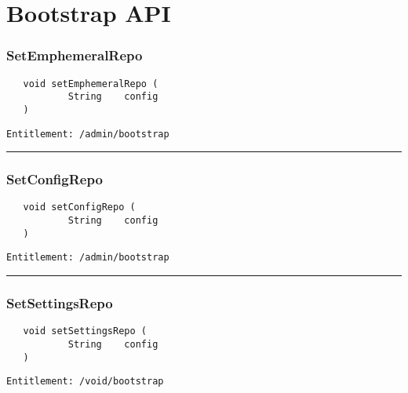 \chapter{Bootstrap API}

\subsection{SetEmphemeralRepo}
\label{Api:SetEmphemeralRepo}
\begin{Verbatim}
   void setEmphemeralRepo (
           String    config
   )
\end{Verbatim}
\begin{Verbatim}[formatcom=\color{Maroon}]
  Entitlement: /admin/bootstrap
\end{Verbatim}



\rule{12cm}{2pt}
\subsection{SetConfigRepo}
\label{Api:SetConfigRepo}
\begin{Verbatim}
   void setConfigRepo (
           String    config
   )
\end{Verbatim}
\begin{Verbatim}[formatcom=\color{Maroon}]
  Entitlement: /admin/bootstrap
\end{Verbatim}



\rule{12cm}{2pt}
\subsection{SetSettingsRepo}
\label{Api:SetSettingsRepo}
\begin{Verbatim}
   void setSettingsRepo (
           String    config
   )
\end{Verbatim}
\begin{Verbatim}[formatcom=\color{Maroon}]
  Entitlement: /void/bootstrap
\end{Verbatim}




